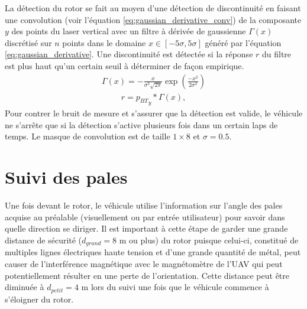 La détection du rotor se fait au moyen d'une détection de discontinuité en faisant une convolution (voir l'équation \ref{eq:gaussian_derivative_conv}) de la composante $y$ des points du laser vertical avec un filtre à dérivée de gaussienne $\Gamma(x)$ discrétisé sur $n$ points dans le domaine $x \in [-5\sigma,5\sigma]$ généré par l'équation \ref{eq:gaussian_derivative}. Une discontinuité est détectée si la réponse $r$ du filtre est plus haut qu'un certain seuil à déterminer de façon empirique.
\begin{align}
  \Gamma(x) = - \frac{x}{\sigma^3 \sqrt{2\pi}} \exp\left(\frac{-x^2}{2 \sigma^2}\right)
  \label{eq:gaussian_derivative}
\end{align}
\begin{align}
  r = {p_{BT}}_y * \Gamma(x),
  \label{eq:gaussian_derivative_conv}
\end{align}
Pour contrer le bruit de mesure et s'assurer que la détection est valide, le véhicule ne s'arrête que si la détection s'active plusieurs fois dans un certain laps de temps.
Le masque de convolution est de taille $1\times8$ et $\sigma = 0.5$.


\section{Suivi des pales}

Une fois devant le rotor, le véhicule utilise l'information sur l'angle des pales acquise au préalable (visuellement ou par entrée utilisateur) pour savoir dans quelle direction se diriger. Il est important à cette étape de garder une grande distance de sécurité ($d_{grand} = 8$ m ou plus) du rotor puisque celui-ci, constitué de multiples lignes électriques haute tension et d'une grande quantité de métal, peut causer de l'interférence magnétique avec le magnétomètre de l'UAV qui peut potentiellement résulter en une perte de l'orientation. Cette distance peut être diminuée à $d_{petit} = 4$ m lors du suivi une fois que le véhicule commence à s'éloigner du rotor.

